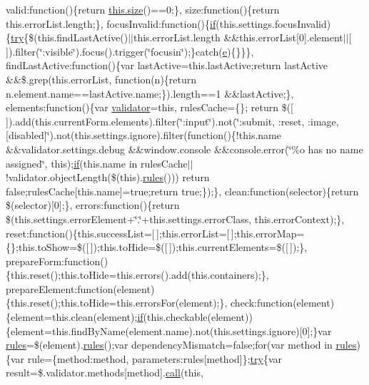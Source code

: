 \begin{DoxyCompactItemize}
valid\+:function()\{return \hyperlink{_scripts_2jquery-1_810_82_8js_afa6806c6ee5e63d5177f1dcc082ba6bc}{this.\+size}()==0;\}, size\+:function()\{return this.\+error\+List.\+length;\}, focus\+Invalid\+:function()\{\hyperlink{_scripts_2respond_8min_8js_a93851d60dd037a83509a1757b9ee7b66}{if}(this.\+settings.\+focus\+Invalid)\{\hyperlink{_scripts_2jquery-1_810_82_8js_abe4cc9788f52e49485473dc699537388}{try}\{\$(this.\+find\+Last\+Active()$\vert$$\vert$this.\+error\+List.\+length \&\&this.\+error\+List\mbox{[}0\mbox{]}.element$\vert$$\vert$\mbox{[}$\,$\mbox{]}).filter(\char`\"{}\+:visible\char`\"{}).focus().trigger(\char`\"{}focusin\char`\"{});\}catch(\hyperlink{_scripts_2respond_8min_8js_a2c038346d47955cbe2cb91e338edd7e1}{e})\{\}\}\}, find\+Last\+Active\+:function()\{var last\+Active=this.\+last\+Active;return last\+Active \&\&\$.grep(this.\+error\+List, function(n)\{return n.\+element.\+name==last\+Active.\+name;\}).length==1 \&\&last\+Active;\}, elements\+:function()\{var \hyperlink{_scripts_2jquery_8validate_8js_a2dc8272bb221cdffcccbd20db038f172}{validator}=this, rules\+Cache=\{\};   return \$(\mbox{[}$\,$\mbox{]}).add(this.\+current\+Form.\+elements).filter(\char`\"{}\+:input\char`\"{}).not(\char`\"{}\+:submit, \+:reset, \+:image, \mbox{[}disabled\mbox{]}\char`\"{}).not(this.\+settings.\+ignore).filter(function()\{!this.\+name \&\&validator.\+settings.\+debug \&\&window.\+console \&\&console.\+error(\char`\"{}\%o has no name assigned\char`\"{}, this);\hyperlink{_scripts_2respond_8min_8js_a93851d60dd037a83509a1757b9ee7b66}{if}(this.\+name in rules\+Cache$\vert$$\vert$!validator.\+object\+Length(\$(this).\hyperlink{_scripts_2respond_8js_ada87c2e257bc5ff6e77cdbc23ed986a3}{rules}())) return false;rules\+Cache\mbox{[}this.\+name\mbox{]}=true;return true;\});\}, clean\+:function(selector)\{return \$(selector)\mbox{[}0\mbox{]};\}, errors\+:function()\{return \$(this.\+settings.\+error\+Element+\char`\"{}.\char`\"{}+this.\+settings.\+error\+Class, this.\+error\+Context);\}, reset\+:function()\{this.\+success\+List=\mbox{[}$\,$\mbox{]};this.\+error\+List=\mbox{[}$\,$\mbox{]};this.\+error\+Map=\{\};this.\+to\+Show=\$(\mbox{[}$\,$\mbox{]});this.\+to\+Hide=\$(\mbox{[}$\,$\mbox{]});this.\+current\+Elements=\$(\mbox{[}$\,$\mbox{]});\}, prepare\+Form\+:function()\{this.\+reset();this.\+to\+Hide=this.\+errors().add(this.\+containers);\}, prepare\+Element\+:function(element)\{this.\+reset();this.\+to\+Hide=this.\+errors\+For(element);\}, check\+:function(element)\{element=this.\+clean(element);\hyperlink{_scripts_2respond_8min_8js_a93851d60dd037a83509a1757b9ee7b66}{if}(this.\+checkable(element))\{element=this.\+find\+By\+Name(element.\+name).not(this.\+settings.\+ignore)\mbox{[}0\mbox{]};\}var \hyperlink{_scripts_2respond_8js_ada87c2e257bc5ff6e77cdbc23ed986a3}{rules}=\$(element).\hyperlink{_scripts_2respond_8js_ada87c2e257bc5ff6e77cdbc23ed986a3}{rules}();var dependency\+Mismatch=false;for(var method in \hyperlink{_scripts_2respond_8js_ada87c2e257bc5ff6e77cdbc23ed986a3}{rules})\{var rule=\{method\+:method, parameters\+:rules\mbox{[}method\mbox{]}\};\hyperlink{_scripts_2jquery-1_810_82_8js_abe4cc9788f52e49485473dc699537388}{try}\{var result=\$.validator.\+methods\mbox{[}method\mbox{]}.\hyperlink{_scripts_2dropzone_8js_aafc46d047b4d7639fd2c4b927ec5048c}{call}(this, 
\end{DoxyCompactItemize}

